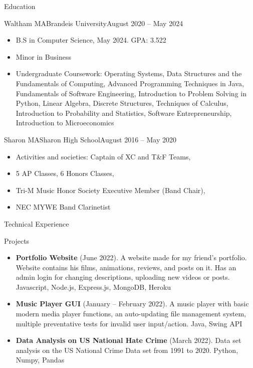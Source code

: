 \documentclass[]{mcdowellcv}
\begin{document}
	\begin{cvsection}{Education}
		\begin{cvsubsection}{Waltham MA}{Brandeis University}{August 2020 – May 2024}
			\begin{itemize}
				\item B.S in Computer Science, May 2024. GPA: 3.522
				\item Minor in Business
				\item Undergraduate Coursework: Operating Systems, Data Structures and the Fundamentals of Computing, Advanced Programming Techniques in Java, Fundamentals of Software Engineering, Introduction to Problem Solving in Python, Linear Algebra, Discrete Structures, Techniques of Calculus, Introduction to Probability and Statistics, Software Entrepreneurship, Introduction to Microeconomics
			\end{itemize}
		\end{cvsubsection}

		\begin{cvsubsection}{Sharon MA}{Sharon High School}{August 2016 – May 2020}
			\begin{itemize}
				\item Activities and societies: Captain of XC and T&F Teams,
				\item 5 AP Classes, 6 Honors Classes,
				\item Tri-M Music Honor Society Executive Member (Band Chair),
				\item NEC MYWE Band Clarinetist
			\end{itemize}
		\end{cvsubsection}
	\end{cvsection}
	
	\begin{cvsection}{Technical Experience}
		\begin{cvsubsection}{Projects}{}{}
			\begin{itemize}
				\item \textbf{Portfolio Website} (June 2022). A website made for my friend’s portfolio. Website contains his films, animations, reviews, and posts on it. Has an admin login for changing descriptions, uploading new videos or posts. Javascript, Node.js, Express.js, MongoDB, Heroku
				\item \textbf{Music Player GUI} (January – February 2022). A music player with basic modern media player functions, an auto-updating file management system, multiple preventative tests for invalid user input/action. Java, Swing API
				\item \textbf{Data Analysis on US National Hate Crime} (March 2022). Data set analysis on the US National Crime Data set from 1991 to 2020. Python, Numpy, Pandas
			\end{itemize}
		\end{cvsubsection}
	\end{cvsection}
	
\end{document}
